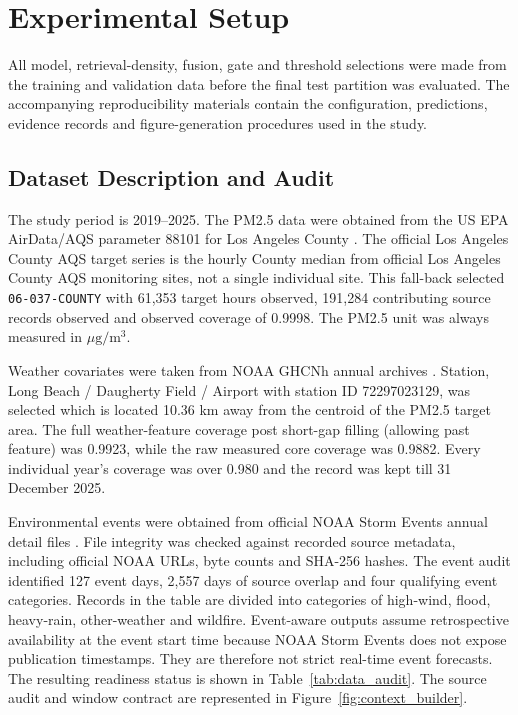 \documentclass{ieeeaccess}
\begin{document}
\section{Experimental Setup}

All model, retrieval-density, fusion, gate and threshold selections were made from the training and validation data before the final test partition was evaluated. The accompanying reproducibility materials contain the configuration, predictions, evidence records and figure-generation procedures used in the study.

\subsection{Dataset Description and Audit}
The study period is 2019--2025. The PM2.5 data were obtained from the US EPA AirData/AQS parameter 88101 for Los Angeles County \cite{epaairdata2026}. The official Los Angeles County AQS target series is the hourly County median from official Los Angeles County AQS monitoring sites, not a single individual site. This fall-back selected \texttt{06-037-COUNTY} with 61,353 target hours observed, 191,284 contributing source records observed and observed coverage of 0.9998. The PM2.5 unit was always measured in $\mu\mathrm{g}/\mathrm{m}^3$.

Weather covariates were taken from NOAA GHCNh annual archives \cite{noaaisd2026}. Station, Long Beach / Daugherty Field / Airport with station ID 72297023129, was selected which is located 10.36 km away from the centroid of the PM2.5 target area. The full weather-feature coverage post short-gap filling (allowing past feature) was 0.9923, while the raw measured core coverage was 0.9882. Every individual year's coverage was over 0.980 and the record was kept till 31 December 2025.

Environmental events were obtained from official NOAA Storm Events annual detail files \cite{noaastormevents2026}. File integrity was checked against recorded source metadata, including official NOAA URLs, byte counts and SHA-256 hashes. The event audit identified 127 event days, 2,557 days of source overlap and four qualifying event categories. Records in the table are divided into categories of high-wind, flood, heavy-rain, other-weather and wildfire. Event-aware outputs assume retrospective availability at the event start time because NOAA Storm Events does not expose publication timestamps. They are therefore not strict real-time event forecasts. The resulting readiness status is shown in Table~\ref{tab:data_audit}. The source audit and window contract are represented in Figure~\ref{fig:context_builder}.
\end{document}
